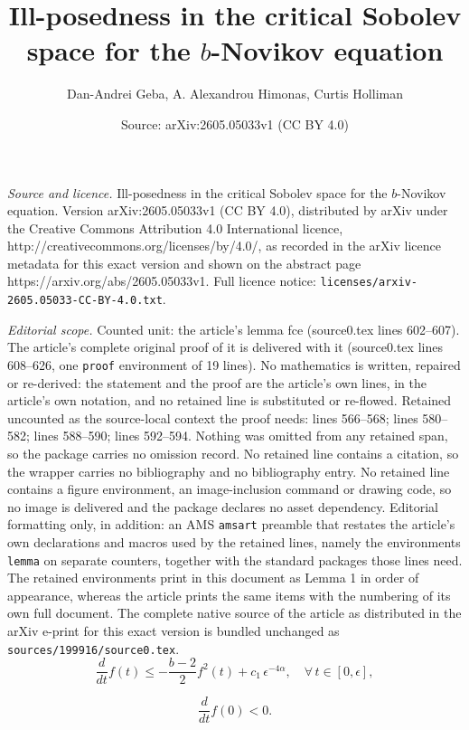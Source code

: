 \documentclass[10pt,a4paper]{amsart}
\title{Ill-posedness in the critical Sobolev space for the $b$-Novikov equation}
\author{Dan-Andrei Geba, A. Alexandrou Himonas, Curtis Holliman}
\date{Source: arXiv:2605.05033v1 (CC BY 4.0)}
\begin{document}
\maketitle

\noindent\emph{Source and licence.} Ill-posedness in the critical Sobolev space for the $b$-Novikov equation. Version arXiv:2605.05033v1 (CC BY 4.0), distributed by arXiv under the Creative Commons Attribution 4.0 International licence, http://creativecommons.org/licenses/by/4.0/, as recorded in the arXiv licence metadata for this exact version and shown on the abstract page https://arxiv.org/abs/2605.05033v1. Full licence notice: \texttt{licenses/arxiv-2605.05033-CC-BY-4.0.txt}.\par\smallskip

\noindent\textit{Editorial scope.} Counted unit: the article's lemma fce (source0.tex lines 602--607). The article's complete original proof of it is delivered with it (source0.tex lines 608--626, one \texttt{proof} environment of 19 lines). No mathematics is written, repaired or re-derived: the statement and the proof are the article's own lines, in the article's own notation, and no retained line is substituted or re-flowed.  Retained uncounted as the source-local context the proof needs: lines 566--568; lines 580--582; lines 588--590; lines 592--594.  Nothing was omitted from any retained span, so the package carries no omission record.  No retained line contains a citation, so the wrapper carries no bibliography and no bibliography entry.  No retained line contains a figure environment, an image-inclusion command or drawing code, so no image is delivered and the package declares no asset dependency.  Editorial formatting only, in addition: an AMS \texttt{amsart} preamble that restates the article's own declarations and macros used by the retained lines, namely the environments \texttt{lemma} on separate counters, together with the standard packages those lines need.  The retained environments print in this document as Lemma 1 in order of appearance, whereas the article prints the same items with the numbering of its own full document.  The complete native source of the article as distributed in the arXiv e-print for this exact version is bundled unchanged as \texttt{sources/199916/source0.tex}.
\begin{equation}
\frac{d}{dt}f(t)\leq -\frac{b-2}{2}f^2(t) +c_1\,\epsilon^{-4\alpha},\quad \forall\,t\in [0,\epsilon],\label{ft}
\end{equation}

\begin{equation}
\frac{d}{dt}f(0)<0.\label{df0}
\end{equation}
\end{document}
